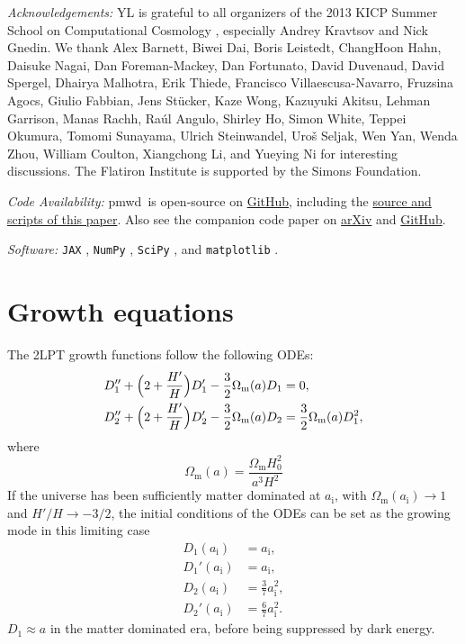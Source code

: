 \documentclass[modern, trackchanges, dvipsnames]{aastex631}
\newcommand{\pmwd}{{\usefont{T1}{nova}{m}{sl}pmwd}}
\newcommand{\Omegam}{\Omega_\mathrm{m}}
\newcommand{\ic}{\mathrm{i}}
\begin{document}
\vspace{1em}
\textit{\large Acknowledgements:}
YL is grateful to all organizers of the 2013 KICP Summer School on
Computational Cosmology \citep{KICPsummer2013}, especially Andrey
Kravtsov and Nick Gnedin.
We thank Alex Barnett, Biwei Dai, Boris Leistedt, ChangHoon Hahn,
Daisuke Nagai, Dan Foreman-Mackey, Dan Fortunato, David Duvenaud, David
Spergel, Dhairya Malhotra, Erik Thiede, Francisco Villaescusa-Navarro,
Fruzsina Agocs, Giulio Fabbian, Jens St\"ucker, Kaze Wong, Kazuyuki
Akitsu, Lehman Garrison, Manas Rachh, Ra\'ul Angulo, Shirley Ho, Simon
White, Teppei Okumura, Tomomi Sunayama, Ulrich Steinwandel, Uro\v{s}
Seljak, Wen Yan, Wenda Zhou, William Coulton, Xiangchong Li, and Yueying
Ni for interesting discussions.
The Flatiron Institute is supported by the Simons Foundation.


\vspace{1em}
\textit{\large Code Availability:}
\pmwd\ is open-source on
\href{https://github.com/eelregit/pmwd}{GitHub}, including the
\href{https://github.com/eelregit/pmwd/tree/master/docs/papers/adjoint}{source
and scripts of this paper}.
Also see the companion code paper on
\href{https://arxiv.org/abs/2211.THIS+1}{arXiv} and
\href{https://github.com/eelregit/pmwd/tree/master/docs/papers/pmwd}{GitHub}.


\vspace{1em}
\textit{\large Software:}
\texttt{JAX} \citep{JAX}, \texttt{NumPy} \citep{NumPy}, \texttt{SciPy}
\citep{SciPy}, and \texttt{matplotlib} \citep{matplotlib}.



\vspace{1em}
\appendix


\vspace{1em}
\section{Growth equations}
\label{app:growth}

The 2LPT growth functions follow the following ODEs:
\begin{align}
  D_1'' + \Bigl( 2 + \frac{H'}H \Bigr) D_1' - \frac32 \Omegam(a) D_1
  &= 0, \nonumber\\
  D_2'' + \Bigl( 2 + \frac{H'}H \Bigr) D_2' - \frac32 \Omegam(a) D_2
  &= \frac32 \Omegam(a) D_1^2,
\end{align}
where
\begin{equation}
    \Omegam(a) = \frac{\Omegam H_0^2}{a^3 H^2}
\end{equation}
If the universe has been sufficiently matter dominated at $a_\ic$, with
$\Omegam(a_\ic) \to 1$ and $H'/H \to -3/2$, the initial conditions of
the ODEs can be set as the growing mode in this limiting case
\begin{align}
    D_1(a_\ic) &= a_\ic, \nonumber\\
    D_1'(a_\ic) &= a_\ic, \nonumber\\
    D_2(a_\ic) &= \frac37 a_\ic^2, \nonumber\\
    D_2'(a_\ic) &= \frac67 a_\ic^2.
\end{align}
$D_1 \approx a$ in the matter dominated era, before being suppressed by
dark energy.
\end{document}
